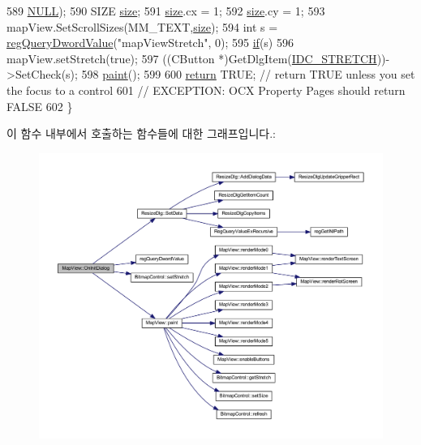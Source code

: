 \begin{DoxyCode}
589             \mbox{\hyperlink{getopt1_8c_a070d2ce7b6bb7e5c05602aa8c308d0c4}{NULL}});
590   SIZE \mbox{\hyperlink{expr-lex_8cpp_ab7d671599a7b25ca99a487fa341bc33a}{size}};
591   \mbox{\hyperlink{expr-lex_8cpp_ab7d671599a7b25ca99a487fa341bc33a}{size}}.cx = 1;
592   \mbox{\hyperlink{expr-lex_8cpp_ab7d671599a7b25ca99a487fa341bc33a}{size}}.cy = 1;
593   mapView.SetScrollSizes(MM\_TEXT,\mbox{\hyperlink{expr-lex_8cpp_ab7d671599a7b25ca99a487fa341bc33a}{size}});
594   \textcolor{keywordtype}{int} s = \mbox{\hyperlink{_reg_8cpp_a150640889ffff4851ee26d7b999ec7c3}{regQueryDwordValue}}("mapViewStretch", 0);
595   \mbox{\hyperlink{arm-new_8h_a93120066fd6daa54150af823953378d1}{if}}(s)
596     mapView.setStretch(true);
597   ((CButton *)GetDlgItem(\mbox{\hyperlink{resource_8h_a639d2318d8892c6f42b323500aae50f0}{IDC\_STRETCH}}))->SetCheck(s);
598   \mbox{\hyperlink{class_map_view_a89edf3053cffa4a68516178dbd987339}{paint}}();
599   
600   \mbox{\hyperlink{gb_codes_8h_a9717e7bbecb906637e86cef6da3d83c2}{return}} TRUE;  \textcolor{comment}{// return TRUE unless you set the focus to a control}
601                 \textcolor{comment}{// EXCEPTION: OCX Property Pages should return FALSE}
602 \}
\end{DoxyCode}
이 함수 내부에서 호출하는 함수들에 대한 그래프입니다.\+:
\nopagebreak
\begin{figure}[H]
\begin{center}
\leavevmode
\includegraphics[width=350pt]{class_map_view_a10c4f05b5c4289dfc08c6501de3cf40c_cgraph}
\end{center}
\end{figure}
\mbox{\label{class_map_view_a9d5b068db40e4d9641bfeca9f81bb53a}} 
